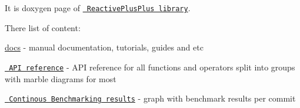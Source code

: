 \label{index_md_docs_Readme}%
%
 It is doxygen page of \href{https://github.com/victimsnino/ReactivePlusPlus}{\texttt{ Reactive\+Plus\+Plus library}}.

There list of content\+:


\begin{DoxyItemize}
\item \mbox{\hyperlink{md_docs__docs_docs}{docs}} -\/ manual documentation, tutorials, guides and etc
\item \href{https://victimsnino.github.io/ReactivePlusPlus/docs/html/modules.html}{\texttt{ API reference}} -\/ API reference for all functions and operators split into groups with marble diagrams for most
\item \href{https://victimsnino.github.io/ReactivePlusPlus/benchmark}{\texttt{ Continous Benchmarking results}} -\/ graph with benchmark results per commit 
\end{DoxyItemize}